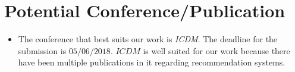 \documentclass[11pt]{article}
\begin{document}
\section{Potential Conference/Publication}
\begin{itemize}
\item The conference that best suits our work is \textit{ICDM}. The deadline for the submission is $05/06/2018$. $ICDM$ is well suited for our work because there have been multiple publications in it regarding recommendation systems.
\end{itemize}
\end{document}
